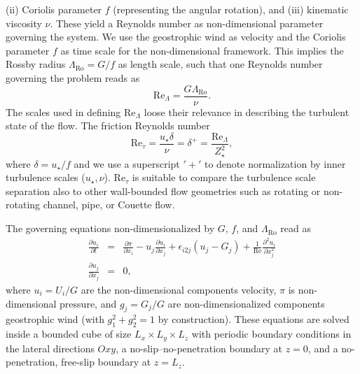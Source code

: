 \documentclass[a4paper,11pt]{amsart}
\newcommand{\p}{\partial}
\newcommand{\RO}{\mathrm{Ro}}
\newcommand{\RE}{\mathrm{Re}}
\newcommand{\LR}{\Lambda_\RO}
\begin{document}
(ii)  Coriolis parameter $f$ (representing the angular rotation), and
(iii) kinematic viscosity $\nu$.
These yield a Reynolds number as non-dimensional parameter governing the system.
%
We use the geostrophic wind as velocity and the Coriolis parameter $f$ as time scale for the non-dimensional
framework.
%
This implies the Rossby radius $\LR=G/f$ as length scale, such that one Reynolds number
governing the problem reads as
%
\begin{equation}
  \RE_\Lambda=\frac{G \LR }{\nu}. 
\end{equation}
%
The scales used in defining $\RE_\Lambda$ loose their relevance in describing the turbulent state of the flow.
%
The friction Reynolds number
\begin{equation}
  \RE_\tau = \frac{u_\star\delta}{\nu} = \delta^+ = \frac{\RE_\Lambda}{Z_\star^2}, 
\end{equation}
where $\delta=u_\star/f$ and we use a superscript $'+'$ to denote normalization by inner turbulence
scales ($u_\star, \nu$).
%
$\RE_\tau$ is suitable to compare the turbulence scale separation also to other wall-bounded flow geometries
such as rotating or non-rotating channel, pipe, or Couette flow.
%
\par
%
The governing equations  non-dimensionalized by $G$, $f$, and $\Lambda_\mathrm{\RO}$ read as 
\begin{subequations} 
\begin{eqnarray}
  \frac{\partial u_i}{\partial t} &=& \frac{\p \pi}{\p x_i} - u_j \frac{\p u_i}{\p x_j} + \epsilon_{i2j} (u_j -G_j)   + \frac{1}{\RE} \frac{\p^2 u_i}{\p x_{j}^2} \\ 
  \frac{\partial u_j}{\partial x_j} &=& 0,   
\end{eqnarray} 
\label{eqn:governing} 
\end{subequations}
where $u_i=U_i/G$ are the non-dimensional components velocity, $\pi$ is non-dimensional pressure, and $g_j=G_j/G$ are non-dimensionalized components
geostrophic wind (with $g_{1}^2+g_{2}^2=1$ by construction).
%
These equations are solved inside a bounded cube of size $L_x \times L_y \times L_z$ with periodic boundary conditions in the lateral directions $Oxy$, a no-slip--no-penetration boundary at $z=0$, and
a no-penetration, free-slip boundary at $z=L_z$.
%
\end{document}
